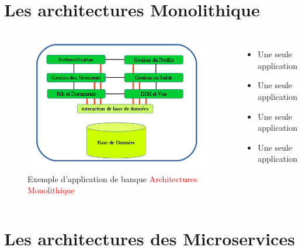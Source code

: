 \documentclass{beamer}
\begin{document}
\section{Les architectures Monolithique}
\begin{frame}
    \begin{columns}
        \begin{figure}
            \begin{center}
            \includegraphics[width=1\textwidth]{monopolitique.png}
                \caption{Exemple d'application de banque \textcolor{red}{Architectures Monolithique}}
            \end{center}
        \end{figure}
        \begin{itemize}
            \item Une seule application
            \item Une seule application
            \item Une seule application
            \item Une seule application
        \end{itemize} 
    \end{columns}

\end{frame}

\section{Les architectures des Microservices}
\end{document}
